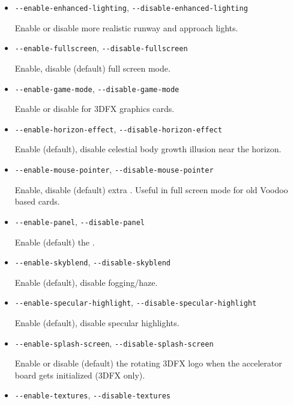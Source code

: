 {\begin{itemize}
Enable or disable more realistic runway and approach light attenuation.

\item{\texttt{-$ $-enable-enhanced-lighting}, \texttt{-$ $-disable-enhanced-lighting}}

Enable or disable more realistic runway and approach lights.

\item{\texttt{-$ $-enable-fullscreen}, \texttt{-$ $-disable-fullscreen}}

Enable, disable (default) full screen mode.

\item{\texttt{-$ $-enable-game-mode}, \texttt{-$ $-disable-game-mode}}

Enable or disable  for 3DFX graphics cards.

\item{\texttt{-$ $-enable-horizon-effect}, \texttt{-$ $-disable-horizon-effect}}

Enable (default), disable celestial body growth illusion near the horizon.

\item{\texttt{-$ $-enable-mouse-pointer}, \texttt{-$ $-disable-mouse-pointer}}

Enable, disable (default) extra . Useful in full screen mode for old Voodoo based cards.

\item{\texttt{-$ $-enable-panel}, \texttt{-$ $-disable-panel}}

Enable (default) the .

\item{\texttt{-$ $-enable-skyblend}, \texttt{-$ $-disable-skyblend}}

Enable (default), disable fogging/haze.

\item{\texttt{-$ $-enable-specular-highlight}, \texttt{-$ $-disable-specular-highlight}}

Enable (default), disable specular highlights.

\item{\texttt{-$ $-enable-splash-screen}, \texttt{-$ $-disable-splash-screen}}

Enable or disable (default) the rotating 3DFX logo when the accelerator board gets initialized (3DFX only).

\item{\texttt{-$ $-enable-textures}, \texttt{-$ $-disable-textures}}


\end{itemize}}
